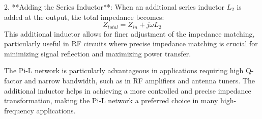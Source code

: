2. **Adding the Series Inductor**: When an additional series inductor \( L_2 \) is added at the output, the total impedance becomes:
   \[
   Z_{total} = Z_{in} + j\omega L_2
   \]
   This additional inductor allows for finer adjustment of the impedance matching, particularly useful in RF circuits where precise impedance matching is crucial for minimizing signal reflection and maximizing power transfer.

The Pi-L network is particularly advantageous in applications requiring high Q-factor and narrow bandwidth, such as in RF amplifiers and antenna tuners. The additional inductor helps in achieving a more controlled and precise impedance transformation, making the Pi-L network a preferred choice in many high-frequency applications.

